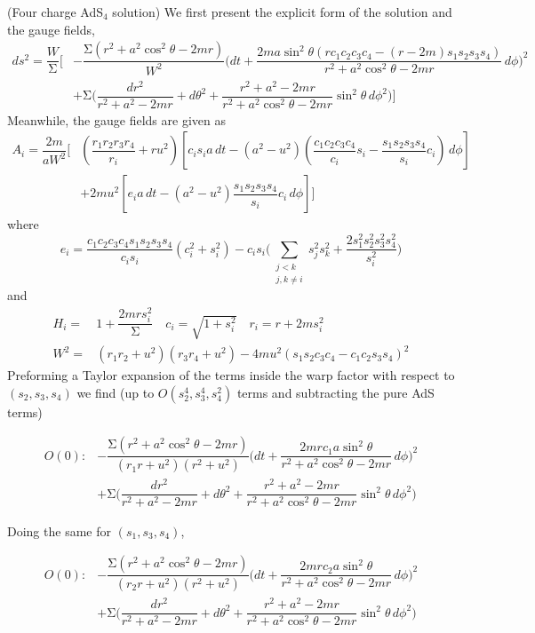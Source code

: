 \vspace{2ex}
\begin{ex}
(Four charge AdS$_4$ solution) 
We first present the explicit form of the solution and the gauge fields,
\[\begin{align*}
	ds^2=\dfrac{W}{\mathrm{\Sigma} }\Big[&-\dfrac{\mathrm{\Sigma} (r^2+a^2\cos ^2\theta -2mr)}{W^2}\Big(dt+\dfrac{2ma\sin ^2\theta (rc_1c_2c_3c_4-(r-2m)s_1s_2s_3s_4)}{r^2+a^2\cos ^2\theta -2mr}\,d\phi \Big)^2\\
	&+\mathrm{\Sigma} \Big(\dfrac{dr^2}{r^2+a^2-2mr}+d\theta ^2+\dfrac{r^2+a^2-2mr}{r^2+a^2\cos ^2\theta -2mr}\sin ^2\theta \,d\phi ^2\Big)\Big]
\end{align*}\]
Meanwhile, the gauge fields are given as
\[\begin{align*}
	A_i=\dfrac{2m}{aW^2}\Big[&(\dfrac{r_1r_2r_3r_4}{r_{i}}+ru^2)[c_is_ia\,dt-(a^2-u^2)(\dfrac{c_1c_2c_3c_4}{c_{i}}s_i-\dfrac{s_1s_2s_3s_4}{s_{i}}c_{i})\,d\phi ]\\
	&+2mu^2[e_ia\,dt-(a^2-u^2)\dfrac{s_1s_2s_3s_4}{s_{i}}c_i\,d\phi ]\Big]
\end{align*}\]
where
	\[e_{i}=\dfrac{c_1c_2c_3c_4s_1s_2s_3s_4}{c_{i}s_{i}}(c_{i}^2+s_{i}^2)-c_{i}s_{i}\Big(\sum _{\substack{j<k\\j,k\ne i}}s_{j}^2s_{k}^2+\dfrac{2s_1^2s_2^2s_3^2s_4^2}{s_{i}^2}\Big)\]
and
\[\begin{align*}
	H_{i}=&1+\dfrac{2mrs_{i}^2}{\mathrm{\Sigma} }
	\quad
	c_{i}=\sqrt{1+s_{i}^2}
	\quad
	r_{i}=r+2ms_{i}^2\\
	W^{2}=&(r_1r_2+u^2)(r_3r_4+u^2)-4mu^2(s_1s_2c_3c_4-c_1c_2s_3s_4)^2
\end{align*}\]
Preforming a Taylor expansion of the terms inside the warp factor with respect to $(s_2,s_3,s_4)$ we find (up to $O(s_2^{4},s_3^{4},s_4^{2})$ terms and subtracting the pure AdS terms)

\[\begin{align*}
	O(0):&-\dfrac{\mathrm{\Sigma} (r^2+a^2\cos ^2\theta -2mr)}{(r_1r+u^2)(r^2+u^2)}\Big(dt+\dfrac{2mrc_1a\sin ^2\theta}{r^2+a^2\cos ^2\theta -2mr}\,d\phi \Big)^2\\
	&+\mathrm{\Sigma} \Big(\dfrac{dr^2}{r^2+a^2-2mr}+d\theta ^2+\dfrac{r^2+a^2-2mr}{r^2+a^2\cos ^2\theta -2mr}\sin ^2\theta \,d\phi ^2\Big)
\end{align*}\]


Doing the same for $(s_1,s_3,s_4)$,

\[\begin{align*}
	O(0):&-\dfrac{\mathrm{\Sigma} (r^2+a^2\cos ^2\theta -2mr)}{(r_2r+u^2)(r^2+u^2)}\Big(dt+\dfrac{2mrc_2a\sin ^2\theta}{r^2+a^2\cos ^2\theta -2mr}\,d\phi \Big)^2\\
	&+\mathrm{\Sigma} \Big(\dfrac{dr^2}{r^2+a^2-2mr}+d\theta ^2+\dfrac{r^2+a^2-2mr}{r^2+a^2\cos ^2\theta -2mr}\sin ^2\theta \,d\phi ^2\Big)
\end{align*}\]


\end{ex}
